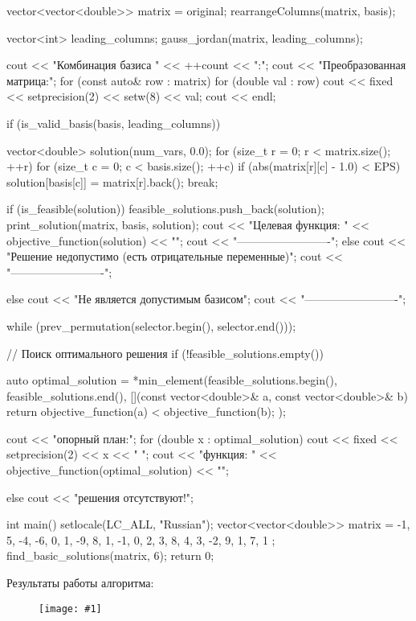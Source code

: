 \documentclass{report}
\newcommand{\drawzalupa}[2]{
	\begin{figure}[H]
		\centering
		\texttt{[image: \#1]}
	\end{figure}
}
\begin{document}
\begin{code}
{{		vector<vector<double>> matrix = original;
		rearrangeColumns(matrix, basis);
		
		vector<int> leading_columns;
		gauss_jordan(matrix, leading_columns);
		
		cout << "Комбинация базиса " << ++count << ":\n";
		cout << "Преобразованная матрица:\n";
		for (const auto& row : matrix) {
			for (double val : row) cout << fixed << setprecision(2) << setw(8) << val;
			cout << endl;
		}
		
		if (is_valid_basis(basis, leading_columns)) {
			vector<double> solution(num_vars, 0.0);
			for (size_t r = 0; r < matrix.size(); ++r) {
				for (size_t c = 0; c < basis.size(); ++c) {
					if (abs(matrix[r][c] - 1.0) < EPS) {
						solution[basis[c]] = matrix[r].back();
						break;
					}
				}
			}
			
			if (is_feasible(solution)) {
				feasible_solutions.push_back(solution);
				print_solution(matrix, basis, solution);
				cout << "Целевая функция: " << objective_function(solution) << "\n";
				cout << "-------------------------\n";
			}
			else {
				cout << "Решение недопустимо (есть отрицательные переменные)\n";
				cout << "-------------------------\n";
			}
		}
		else {
			cout << "Не является допустимым базисом\n";
			cout << "-------------------------\n";
		}
		
	} while (prev_permutation(selector.begin(), selector.end()));
	
	// Поиск оптимального решения
	if (!feasible_solutions.empty()) {
		auto optimal_solution = *min_element(feasible_solutions.begin(), feasible_solutions.end(),
		[](const vector<double>& a, const vector<double>& b) {
			return objective_function(a) < objective_function(b);
		});
		
		cout << " опорный план:\n";
		for (double x : optimal_solution) cout << fixed << setprecision(2) << x << " ";
		cout << " функция: " << objective_function(optimal_solution) << "\n";
	}
	else {
		cout << " решения отсутствуют!\n";
	}
}

int main() {
	setlocale(LC_ALL, "Russian");
	vector<vector<double>> matrix = {
		{-1, 5, -4, -6, 0, 1, -9},
		{8, 1, -1, 0, 2, 3, 8},
		{4, 3, -2, 9, 1, 7, 1}
	};
	find_basic_solutions(matrix, 6);
	return 0;
}
	\end{code}
	
	
	\newpage
	
	Результаты работы алгоритма:
	
	\drawzalupa{images/task2.png}{0.9}
	
\end{document}
